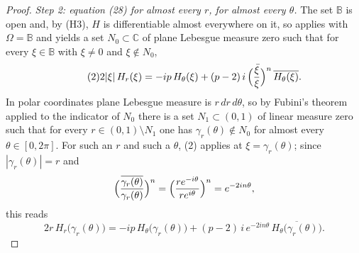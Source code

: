 \begin{proof}
\emph{Step 2: equation (28) for almost every $r$, for almost every $\theta$.}
The set $\mathbb{B}$ is open and, by (H3), $H$ is differentiable almost
everywhere on it, so  applies with $\Omega=\mathbb{B}$ and
yields a set $N_0\subset\mathbb{C}$ of plane Lebesgue measure zero such that
for every $\xi\in\mathbb{B}$ with $\xi\neq0$ and $\xi\notin N_0$,
\begin{equation}\tag{2}
  2|\xi|\,H_r(\xi)=-ip\,H_\theta(\xi)
    +(p-2)\,i\,\Bigl(\frac{\bar\xi}{\xi}\Bigr)^{n}\,\overline{H_\theta(\xi)} .
\end{equation}
In polar coordinates plane Lebesgue measure is $r\,dr\,d\theta$, so by Fubini's
theorem applied to the indicator of $N_0$ there is a set $N_1\subset(0,1)$ of
linear measure zero such that for every $r\in(0,1)\setminus N_1$ one has
$\gamma_r(\theta)\notin N_0$ for almost every $\theta\in[0,2\pi]$.  For such an
$r$ and such a $\theta$, (2) applies at $\xi=\gamma_r(\theta)$; since
$|\gamma_r(\theta)|=r$ and
\[
  \Bigl(\frac{\overline{\gamma_r(\theta)}}{\gamma_r(\theta)}\Bigr)^{n}
  =\Bigl(\frac{re^{-i\theta}}{re^{i\theta}}\Bigr)^{n}=e^{-2in\theta},
\]
this reads
\begin{equation}\tag{3}
  2r\,H_r\bigl(\gamma_r(\theta)\bigr)=-ip\,H_\theta\bigl(\gamma_r(\theta)\bigr)
    +(p-2)\,i\,e^{-2in\theta}\,\overline{H_\theta\bigl(\gamma_r(\theta)\bigr)} .
\end{equation}


\end{proof}
